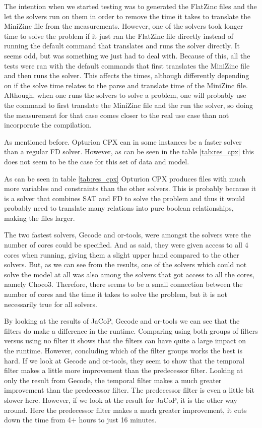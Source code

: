 The intention when we started testing was to generated the FlatZinc files and the let the solvers run on them in order to remove the time it takes to translate the MiniZinc file from the measurements. However, one of the solvers took longer time to solve the problem if it just ran the FlatZinc file directly instead of running the default command that translates and runs the solver directly. It seems odd, but was something we just had to deal with. Because of this, all the tests were ran with the default commands that first translates the MiniZinc file and then runs the solver. This affects the times, although differently depending on if the solve time relates to the parse and translate time of the MiniZinc file. Although, when one runs the solvers to solve a problem, one will probably use the command to first translate the MiniZinc file and the run the solver, so doing the measurement for that case comes closer to the real use case than not incorporate the compilation.

As mentioned before. Opturion CPX can in some instances be a faster solver than a regular FD solver. However, as can be seen in the table \ref{tab:res_cpx} this does not seem to be the case for this set of data and model.

As can be seen in table \ref{tab:res_cpx} Opturion CPX produces files with much more variables and constraints than the other solvers. This is probably because it is a solver that combines SAT and FD to solve the problem and thus it would probably need to translate many relations into pure boolean relationships, making the files larger.

The two fastest solvers, Gecode and or-tools, were amongst the solvers were the number of cores could be specified. And as said, they were given access to all 4 cores when running, giving them a slight upper hand compared to the other solvers. But, as we can see from the results, one of the solvers which could not solve the model at all was also among the solvers that got access to all the cores, namely Choco3. Therefore, there seems to be a small connection between the number of cores and the time it takes to solve the problem, but it is not necessarily true for all solvers.

By looking at the results of JaCoP, Gecode and or-tools we can see that the filters do make a difference in the runtime. Comparing using both groups of filters versus using no filter it shows that the filters can have quite a large impact on the runtime. However, concluding which of the filter groups works the best is hard. If we look at Gecode and or-tools, they seem to show that the temporal filter makes a little more improvement than the predecessor filter. Looking at only the result from Gecode, the temporal filter makes a much greater improvement than the predecessor filter. The predecessor filter is even a little bit slower here. However, if we look at the result for JaCoP, it is the other way around. Here the predecessor filter makes a much greater improvement, it cuts down the time from 4+ hours to just 16 minutes.

